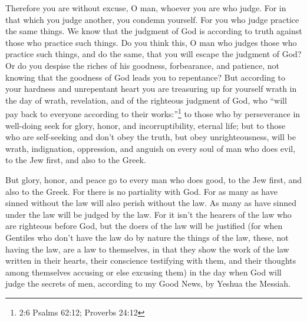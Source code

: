 \mychapter{} \myverse*{}Therefore you are without excuse, O man, whoever you are who judge.
For in that which you judge another, you condemn yourself. For you who judge practice the same things.
\myverse{}We know that the judgment of God is according to truth against those who practice
such things.
\myverse{}Do you think this, O man who judges those who practice such things, and do the
same, that you will escape the judgment of God?
\myverse{}Or do you despise the riches of his goodness, forbearance, and patience, not
knowing that the goodness of God leads you to repentance?
\myverse{}But according to your hardness and unrepentant heart you are treasuring up for
yourself wrath in the day of wrath, revelation, and of the righteous judgment of God,
\myverse{}who “will pay back to everyone according to their works:”\footnote{2:6 Psalms 62:12;
	Proverbs 24:12}
\myverse{}to those who by perseverance in well-doing seek for glory, honor, and incorruptibility,
eternal life;
\myverse{}but to those who are self-seeking and don’t obey the truth, but obey unrighteousness,
will be wrath, indignation,
\myverse{}oppression, and anguish on every soul of man who does evil, to the Jew first,
and also to the Greek.

\myverse{}But glory, honor, and peace go to every man who does good, to
the Jew first, and also to the Greek.
\myverse{}For there is no partiality with God.
\myverse{}For as many as have sinned without the law will also perish without the law.
As many as have sinned under the law will be judged by the law.
\myverse{}For it isn’t the hearers of the law who are righteous before God, but the
doers of the law will be justified
\myverse{}(for when Gentiles who don’t have the law do by nature the things of the law,
these, not having the law, are a law to themselves,
\myverse{}in that they show the work of the law written in their hearts, their conscience
testifying with them, and their thoughts among themselves accusing or else excusing them)
\myverse{}in the day when God will judge the secrets of men, according to my Good News,
by Yeshua the Messiah.

